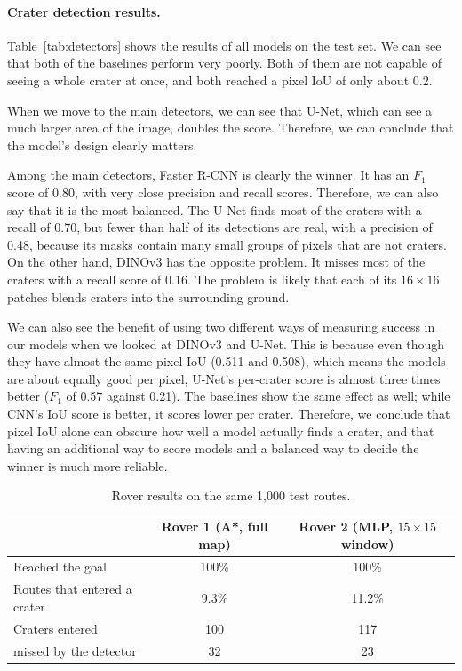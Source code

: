 \documentclass{article} %
\begin{document}
\paragraph{Crater detection results.}

Table~\ref{tab:detectors} shows the results of all models on the test set. We can see that both of the baselines perform very poorly. Both of them are not capable of seeing a whole crater at once, and both reached a pixel IoU of only about 0.2.

When we move to the main detectors, we can see that U-Net, which can see a much larger area of the image, doubles the score. Therefore, we can conclude that the model's design clearly matters.

Among the main detectors, Faster R-CNN is clearly the winner. It has an $F_1$ score of 0.80, with very close precision and recall scores. Therefore, we can also say that it is the most balanced. The U-Net finds most of the craters with a recall of 0.70, but fewer than half of its detections are real, with a precision of 0.48, because its masks contain many small groups of pixels that are not craters. On the other hand, DINOv3 has the opposite problem. It misses most of the craters with a recall score of 0.16. The problem is likely that each of its $16 \times 16$ patches blends craters into the surrounding ground.

We can also see the benefit of using two different ways of measuring success in our models when we looked at DINOv3 and U-Net. This is because even though they have almost the same pixel IoU (0.511 and 0.508), which means the models are about equally good per pixel, U-Net's per-crater score is almost three times better ($F_1$ of 0.57 against 0.21). The baselines show the same effect as well; while CNN's IoU score is better, it scores lower per crater. Therefore, we conclude that pixel IoU alone can obscure how well a model actually finds a crater, and that having an additional way to score models and a balanced way to decide the winner is much more reliable.

\begin{table}[t]
  \centering
  \begin{tabular}{lcc}
    \toprule
    & Rover 1 (A*, full map) & Rover 2 (MLP, $15 \times 15$ window) \\
    \midrule
    Reached the goal & 100\% & 100\% \\
    Routes that entered a crater & 9.3\% & 11.2\% \\
    Craters entered & 100 & 117 \\
    \quad missed by the detector & 32 & 23 \\
    \bottomrule
  \end{tabular}
  \caption{Rover results on the same 1,000 test routes.}
  \label{tab:rovers}
\end{table}
\end{document}

